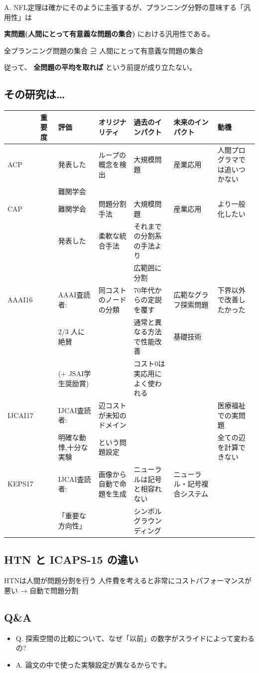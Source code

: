 A. NFL定理は確かにそのように主張するが、プランニング分野の意味する「汎用性」は

\textbf{実問題(人間にとって有意義な問題の集合)} における汎用性である。

\begin{center}
全プランニング問題の集合 ⊇ 人間にとって有意義な問題の集合
\end{center}

従って、 \textbf{全問題の平均を取れば} という前提が成り立たない。

\subsection{その研究は\ldots{}}
\label{sec:orgheadline64}

\begin{center}
\begin{tabular}{lllllll}
 & 重要度 & 評価 & オリジナリティ & 過去のインパクト & 未来のインパクト & 動機\\
\hline
ACP &  & 発表した & ループの概念を検出 & 大規模問題 & 産業応用 & 人間プログラマでは追いつかない\\
 &  & 難関学会 &  &  &  & \\
\hline
CAP &  & 難関学会 & 問題分割手法 & 大規模問題 & 産業応用 & より一般化したい\\
 &  & 発表した & 柔軟な統合手法 & それまでの分割系の手法より &  & \\
 &  &  &  & 広範囲に分割 &  & \\
\hline
AAAI16 &  & AAAI査読者: & 同コストのノードの分類 & 70年代からの定説を覆す & 広範なグラフ探索問題 & 下界以外で改善したかった\\
 &  & 2/3 人に絶賛 &  & 通常と異なる方法で性能改善 & 基礎技術 & \\
 &  & (+ JSAI学生奨励賞) &  & コスト0は実応用によく使われる &  & \\
\hline
IJCAI17 &  & IJCAI査読者: & 辺コストが未知のドメイン &  &  & 医療福祉での実問題\\
 &  & 明確な動悸,十分な実験 & という問題設定 &  &  & 全ての辺を計算できない\\
\hline
KEPS17 &  & IJCAI査読者: & 画像から自動で命題を生成 & ニューラルは記号と相容れない & ニューラル・記号複合システム & \\
 &  & 「重要な方向性」 &  & シンボルグラウンディング &  & \\
\hline
\end{tabular}
\end{center}

\subsection{HTN と ICAPS-15 の違い}
\label{sec:orgheadline65}

HTNは人間が問題分割を行う
人件費を考えると非常にコストパフォーマンスが悪い
→ 自動で問題分割

\subsection{Q\&A}
\label{sec:orgheadline66}

\begin{itemize}
\item Q. 探索空間の比較について、なぜ「以前」の数字がスライドによって変わるの?
\item A. 論文の中で使った実験設定が異なるからです。
\end{itemize}
\stopcontents[level-1]
